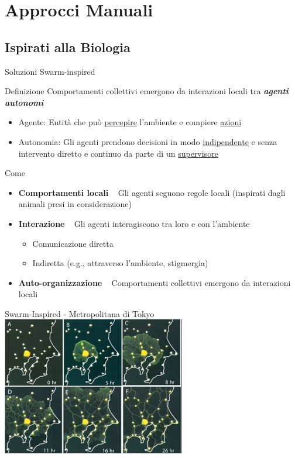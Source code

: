 \documentclass[presentation, 10pt,aspectratio=169]{beamer}\mode<presentation>{\usetheme{AMSBolognaFC}}
\begin{document}
\section{Approcci Manuali}


\subsection{Ispirati alla Biologia}

\begin{frame}{Soluzioni Swarm-inspired}
	\begin{exampleblock}{Definizione}
		Comportamenti collettivi \alert{emergono} da interazioni locali tra \emph{\textbf{agenti autonomi}}
		\begin{itemize}
			\item \alert{Agente}: Entità che può \underline{percepire} l'ambiente e compiere \underline{azioni}
			\item \alert{Autonomia}: Gli agenti prendono decisioni in modo \underline{indipendente} e senza intervento diretto e continuo da parte di un \underline{supervisore}
		\end{itemize}
	\end{exampleblock}
	\begin{block}{Come}
		\begin{itemize}
			\item \textbf{Comportamenti locali} \faArrowRight ~ Gli agenti seguono regole locali (inspirati dagli animali presi in considerazione)
			\item \textbf{Interazione} \faArrowRight ~ Gli agenti interagiscono tra loro e con l'ambiente
			\begin{itemize}
				\item Comunicazione diretta 
				\item Indiretta (e.g., attraverso l'ambiente, stigmergia)
			\end{itemize}
			\item \textbf{Auto-organizzazione} \faArrowRight ~ Comportamenti collettivi emergono da interazioni locali
		\end{itemize}
	\end{block}
\end{frame}
\begin{frame}{Swarm-Inspired - Metropolitana di Tokyo}
	\centering
	\href{https://www.youtube.com/shorts/GwKuFREOgmo}{\includegraphics[width=0.6\textwidth]{img/metro-tokyo.png}}
\end{frame}
\end{document}
